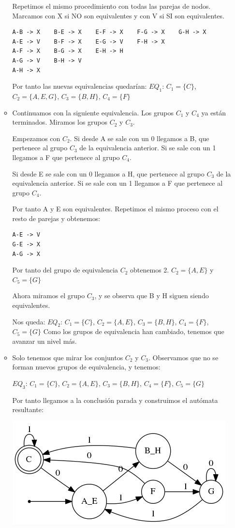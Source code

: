 \documentclass{apuntes}
\begin{document}
\begin{example}
\begin{enumerate}
\begin{itemize}
Repetimos el mismo procedimiento con todas las parejas de nodos. Marcamos con X si NO son equivalentes y con V si SI son equivalentes.

\begin{verbatim}
A-B -> X    B-E -> X    E-F -> X    F-G -> X    G-H -> X
A-E -> V    B-F -> X    E-G -> V    F-H -> X
A-F -> X    B-G -> X    E-H -> H
A-G -> V    B-H -> V
A-H -> X
\end{verbatim}

Por tanto las nuevas equivalencias quedarían:
$EQ_1$: $C_1=\{C\}$, $C_2=\{A,E,G\}$, $C_3=\{B,H\}$, $C_4=\{F\}$

\item Continuamos con la siguiente equivalencia. Los grupos $C_1$ y $C_4$ ya están terminados. Miramos los grupos $C_2$ y $C_3$.

Empezamos con $C_2$. Si desde A se sale con un 0 llegamos a B, que pertenece al grupo $C_3$ de la equivalencia anterior. Si se sale con un 1 llegamos a F que pertenece al grupo $C_4$.

Si desde E se sale con un 0 llegamos a H, que pertenece al grupo $C_3$ de la equivalencia anterior. Si se sale con un 1 llegamos a F que pertenece al grupo $C_4$.

Por tanto A y E son equivalentes. Repetimos el mismo proceso con el resto de parejas y obtenemos:
\begin{verbatim}
A-E -> V
G-E -> X
A-G -> X
\end{verbatim}
Por tanto del grupo de equivalencia $C_2$ obtenemos 2. $C_2=\{A,E\}$ y $C_5=\{G\}$

Ahora miramos el grupo $C_3$, y se observa que B y H siguen siendo equivalentes.

Nos queda: $EQ_2$: $C_1=\{C\}$, $C_2=\{A,E\}$, $C_3=\{B,H\}$, $C_4=\{F\}$, $C_5=\{G\}$
Como los grupos de equivalencia han cambiado, tenemos que avanzar un nivel más.

\item Solo tenemos que mirar los conjuntos $C_2$ y $C_3$. Observamos que no se forman nuevos grupos de equivalencia, y tenemos:

$EQ_3$: $C_1=\{C\}$, $C_2=\{A,E\}$, $C_3=\{B,H\}$, $C_4=\{F\}$, $C_5=\{G\}$

Por tanto llegamos a la conclusión parada y construimos el autómata resultante:

\begin{center}
\includegraphics[scale=0.4]{automataFinal4.png}
\end{center}
\end{itemize}
\end{enumerate}


\end{example}
\end{document}
